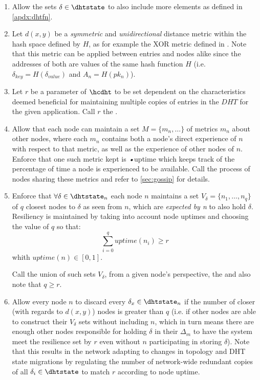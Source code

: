 \documentclass[twocolumn,showpacs,
  nofootinbib,aps,superscriptaddress,
  eqsecnum,prd,notitlepage,showkeys,10pt]{revtex4-1}
\begin{document}
\begin{enumerate}
\begin{enumerate}
\item Allow the sets $\delta \in \dhtstate$ to also include more elements as defined in  \ref{apdx:dhtfn}.

\item Let $d(x,y)$ be a \textit{symmetric} and \textit{unidirectional} distance metric within the hash space defined by $H$, as for example the XOR metric defined in \cite{kademlia}. Note that this metric can be applied between entries and nodes alike since the addresses of both are values of the same hash function $H$ (i.e. $\delta_{key}=H(\delta_{value})$ and $A_n=H(pk_n)$).

\item Let $r$ be a parameter of $\hcdht$ to be set dependent on the characteristics deemed beneficial for maintaining multiple copies of entries in the $DHT$ for the given application.
Call $r$ the .

\label{dht:metrics}
\item Allow that each node can maintain a set $M = \{m_n, \dots \}$ of metrics $m_n$ about other nodes, where each $m_n$ contains both a node's direct experience of $n$ with respect to that metric, as well as the experience of other nodes of $n$.  Enforce that one such metric kept is \textit{•}{uptime} which keeps track of the percentage of time a node is experienced to be available.   Call the process of nodes sharing these metrics  and refer to \ref{sec:gossip} for details.

\item  Enforce that $\forall \delta \in \dhtstate_n$ each node $n$ maintains a set $V_\delta = \{n_1,\dots,n_q\}$ of $q$ closest nodes to $\delta$ as seen from $n$, which are \textit{expected by n} to also hold $\delta$. Resiliency is maintained by taking into account node uptimes and choosing the value of $q$ so that:
\begin{equation}
\sum_{i=0}^q uptime(n_i)\geq r
\end{equation}
whith $uptime(n) \in [0,1]$.

Call the union of such sets $V_\delta$, from a given node's perspective, the  and also note that $q\geq r$.

\item \label{hc:shards} Allow every node $n$ to discard every $\delta_x \in \dhtstate_n$ if the number of closer (with regards to $d(x,y)$) nodes is greater than $q$
(i.e. if other nodes are able to construct their $V_\delta$ sets without including $n$, which in turn means there are enough other nodes responsible for holding $\delta$ in their $\Delta_m$ to have the system meet the resilience set by $r$ even without $n$ participating in storing $\delta$).
Note that this results in the network adapting to changes in topology and DHT state migrations by regulating the number of network-wide redundant copies of all $\delta_i\in\dhtstate$ to match $r$ according to node uptime.


\end{enumerate}
\end{enumerate}
\end{document}
